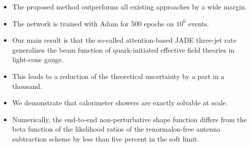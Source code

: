 \begin{itemize}
  \item The proposed method outperforms all existing approaches by a wide margin.
  \item The network is trained with Adam for 500 epochs on $10^6$ events.
  \item Our main result is that the so-called attention-based JADE three-jet rate generalizes the beam function of quark-initiated effective field theories in light-cone gauge.
\end{itemize}

\begin{itemize}
  \item This leads to a reduction of the theoretical uncertainty by a part in a thousand.
  \item We demonstrate that calorimeter showers are exactly solvable at scale.
  \item Numerically, the end-to-end non-perturbative shape function differs from the beta function of the likelihood ratios of the renormalon-free antenna subtraction scheme by less than five percent in the soft limit.
\end{itemize}


